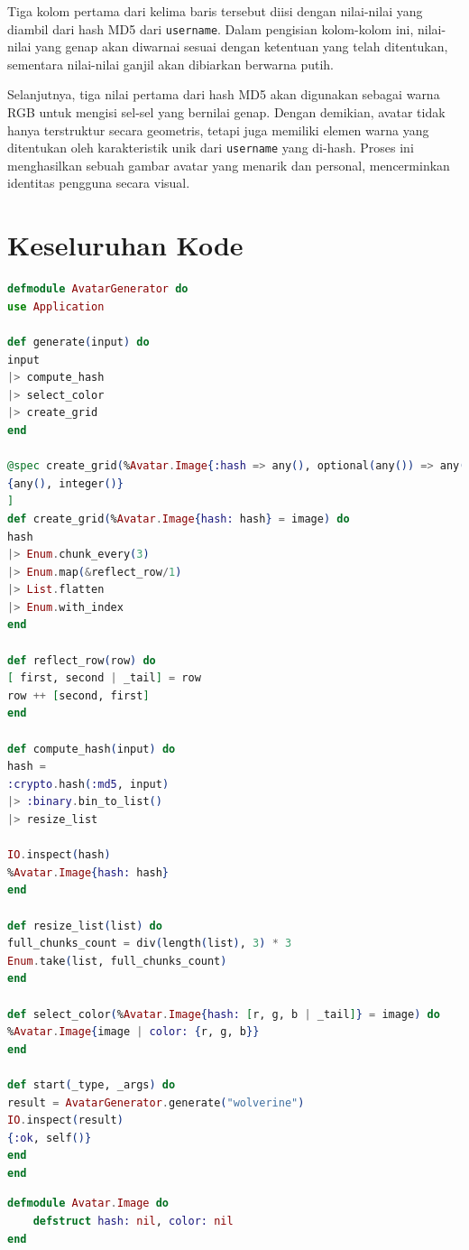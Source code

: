Tiga kolom pertama dari kelima baris tersebut diisi dengan nilai-nilai yang diambil dari hash MD5 dari \texttt{username}. Dalam pengisian kolom-kolom ini, nilai-nilai yang genap akan diwarnai sesuai dengan ketentuan yang telah ditentukan, sementara nilai-nilai ganjil akan dibiarkan berwarna putih. 

Selanjutnya, tiga nilai pertama dari hash MD5 akan digunakan sebagai warna RGB untuk mengisi sel-sel yang bernilai genap. Dengan demikian, avatar tidak hanya terstruktur secara geometris, tetapi juga memiliki elemen warna yang ditentukan oleh karakteristik unik dari \texttt{username} yang di-hash. Proses ini menghasilkan sebuah gambar avatar yang menarik dan personal, mencerminkan identitas pengguna secara visual.

\section{Keseluruhan Kode}

\begin{lstlisting}[language=Elixir, caption={Keseluruhan Kode src/avatar.ex}]
defmodule AvatarGenerator do
use Application

def generate(input) do
input
|> compute_hash
|> select_color
|> create_grid
end

@spec create_grid(%Avatar.Image{:hash => any(), optional(any()) => any()}) :: [
{any(), integer()}
]
def create_grid(%Avatar.Image{hash: hash} = image) do
hash
|> Enum.chunk_every(3)
|> Enum.map(&reflect_row/1)
|> List.flatten
|> Enum.with_index
end

def reflect_row(row) do
[ first, second | _tail] = row
row ++ [second, first]
end

def compute_hash(input) do
hash =
:crypto.hash(:md5, input)
|> :binary.bin_to_list()
|> resize_list

IO.inspect(hash)
%Avatar.Image{hash: hash}
end

def resize_list(list) do
full_chunks_count = div(length(list), 3) * 3
Enum.take(list, full_chunks_count)
end

def select_color(%Avatar.Image{hash: [r, g, b | _tail]} = image) do
%Avatar.Image{image | color: {r, g, b}}
end

def start(_type, _args) do
result = AvatarGenerator.generate("wolverine")
IO.inspect(result)
{:ok, self()}
end
end

\end{lstlisting}

\begin{lstlisting}[language=Elixir, caption={Keseluruhan Kode src/image.ex}]
defmodule Avatar.Image do
	defstruct hash: nil, color: nil
end
\end{lstlisting}

